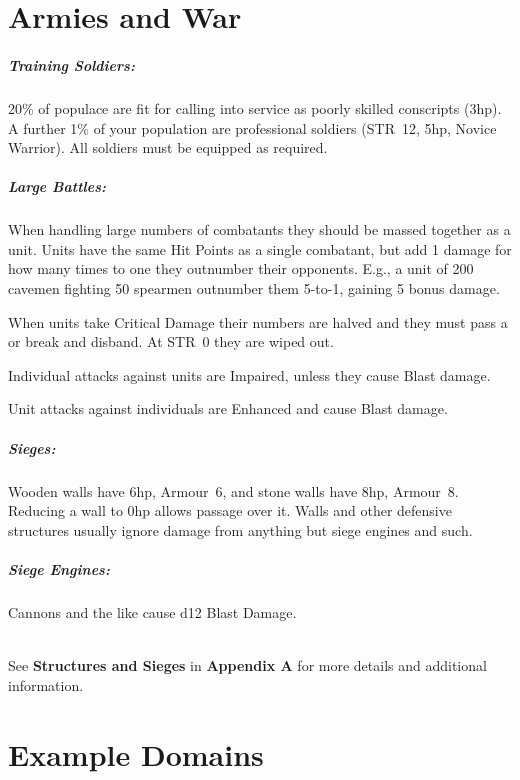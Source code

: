 \documentclass[itdr]{subfiles}
\begin{document}
\section{Armies and War}


\subparagraph{Training Soldiers:} 20\% of populace are fit for calling into service as poorly skilled conscripts (3hp). A further 1\% of your population are professional soldiers (STR~12, 5hp, Novice Warrior). All soldiers must be equipped as required.

\subparagraph{Large Battles:} When handling large numbers of combatants they should be massed together as a unit. Units have the same Hit Points as a single combatant, but add 1 damage for how many times to one they outnumber their opponents. E.g., a unit of 200 cavemen fighting 50 spearmen outnumber them 5-to-1, gaining 5 bonus damage.

When units take Critical Damage their numbers are halved and they must pass a  or break and disband. At STR~0 they are wiped out.

Individual attacks against units are Impaired, unless they cause Blast damage.

Unit attacks against individuals are Enhanced and cause Blast damage.

\subparagraph{Sieges:} Wooden walls have 6hp, Armour~6, and stone walls have 8hp, Armour~8. Reducing a wall to 0hp allows passage over it. Walls and other defensive structures usually ignore damage from anything but siege engines and such.

\subparagraph{Siege Engines:} Cannons and the like cause d12 Blast Damage.

\vspace{-0.2em}
\begin{dbox}
	~\\
	See \textbf{Structures and Sieges} in \textbf{Appendix A} for more details and additional information.
\end{dbox}
\vspace{-0.2em}

\section{Example Domains}
\end{document}
